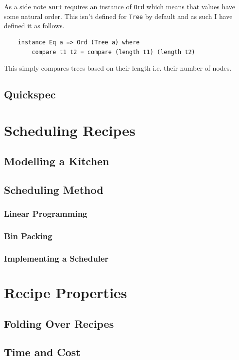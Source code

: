 \documentclass[11pt]{article}
\begin{document}
\medbreak

As a side note \texttt{sort} requires an instance of \texttt{Ord} which means that values have some
natural order. This isn't defined for \texttt{Tree} by default and as such I have defined it as follows.

\begin{lstlisting}
    instance Eq a => Ord (Tree a) where
        compare t1 t2 = compare (length t1) (length t2)
\end{lstlisting}

This simply compares trees based on their length i.e.
their number of nodes.

\subsection{Quickspec}

\section{Scheduling Recipes}
\subsection{Modelling a Kitchen}
\subsection{Scheduling Method}
\subsubsection{Linear Programming}
\subsubsection{Bin Packing}
\subsubsection{Implementing a Scheduler}

\section{Recipe Properties}
\subsection{Folding Over Recipes}
\subsection{Time and Cost}
\end{document}
